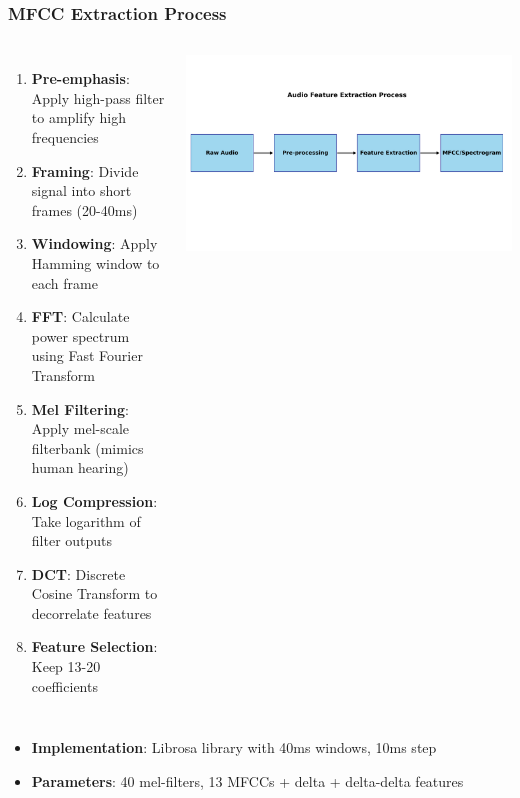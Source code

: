 \documentclass{beamer}
\begin{document}
\begin{frame}
\frametitle{MFCC Extraction Process}
\begin{columns}
\begin{enumerate}
    \item \textbf{Pre-emphasis}: Apply high-pass filter to amplify high frequencies
    \item \textbf{Framing}: Divide signal into short frames (20-40ms)
    \item \textbf{Windowing}: Apply Hamming window to each frame
    \item \textbf{FFT}: Calculate power spectrum using Fast Fourier Transform
    \item \textbf{Mel Filtering}: Apply mel-scale filterbank (mimics human hearing)
    \item \textbf{Log Compression}: Take logarithm of filter outputs
    \item \textbf{DCT}: Discrete Cosine Transform to decorrelate features
    \item \textbf{Feature Selection}: Keep 13-20 coefficients
\end{enumerate}

\includegraphics[width=\textwidth]{figures/audio_feature_extraction.png}
\end{columns}

\begin{itemize}
    \item \textbf{Implementation}: Librosa library with 40ms windows, 10ms step
    \item \textbf{Parameters}: 40 mel-filters, 13 MFCCs + delta + delta-delta features
\end{itemize}
\end{frame}
\end{document}
